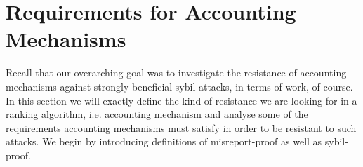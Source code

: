 \documentclass[11pt,a4paper]{report}
\theoremstyle{definition}
\theoremstyle{theorem}
\theoremstyle{proposition}
\theoremstyle{corollary}
\theoremstyle{lemma}
\theoremstyle{example}
\theoremstyle{remark}
\begin{document}

\section{Requirements for Accounting Mechanisms}
\label{sec:Requirements for Accounting Mechanisms}
Recall that our overarching goal was to investigate the resistance of accounting mechanisms against strongly beneficial sybil attacks, in terms of work, of course. In this section we will exactly define the kind of resistance we are looking for in a ranking algorithm, i.e. accounting mechanism and analyse some of the requirements accounting mechanisms must satisfy in order to be resistant to such attacks. We begin by introducing definitions of misreport-proof as well as sybil-proof.
\end{document}
